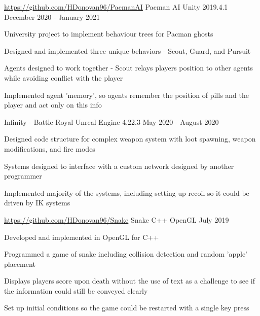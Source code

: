 

\begin{cventries}
    \cventry
    {\href{https://github.com/HDonovan96/PacmanAI}{https://github.com/HDonovan96/PacmanAI}}
    {Pacman AI}
    {Unity 2019.4.1}
    {December 2020 - January 2021}
    {
        \begin{cvitems}
            \item University project to implement behaviour trees for Pacman ghosts
            \item Designed and implemented three unique behaviors - Scout, Guard, and Pursuit
            \item Agents designed to work together - Scout relays players position to other agents while avoiding conflict with the player
            \item Implemented agent 'memory', so agents remember the position of pills and the player and act only on this info
        \end{cvitems}
    }

    \cventry
    {}
    {Infinity - Battle Royal}
    {Unreal Engine 4.22.3}
    {May 2020 - August 2020}
    {
        \begin{cvitems}
            \item Designed code structure for complex weapon system with loot spawning, weapon modifications, and fire modes
            \item Systems designed to interface with a custom network designed by another programmer
            \item Implemented majority of the systems, including setting up recoil so it could be driven by IK systems
        \end{cvitems}
    }

    \cventry
    {\href{https://github.com/HDonovan96/Snake}{https://github.com/HDonovan96/Snake}}
    {Snake}
    {C++ OpenGL}
    {July 2019}
    {
        \begin{cvitems}
            \item Developed and implemented in OpenGL for C++
            \item Programmed a game of snake including collision detection and random 'apple' placement
            \item Displays players score upon death without the use of text as a challenge to see if the information could still be conveyed clearly
            \item Set up initial conditions so the game could be restarted with a single key press
        \end{cvitems}  
    }


\end{cventries}
